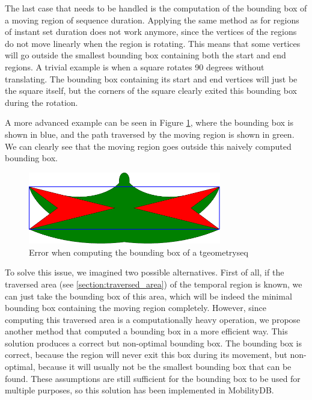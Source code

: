 The last case that needs to be handled is the computation of the bounding box of a moving region of sequence duration. Applying the same method as for regions of instant set duration does not work anymore, since the vertices of the regions do not move linearly when the region is rotating. This means that some vertices will go outside the smallest bounding box containing both the start and end regions. A trivial example is when a square rotates 90 degrees without translating. The bounding box containing its start and end vertices will just be the square itself, but the corners of the square clearly exited this bounding box during the rotation. 

A more advanced example can be seen in Figure \ref{fig:naive_bbox_error}, where the bounding box is shown in blue, and the path traversed by the moving region is shown in green. We can clearly see that the moving region goes outside this naively computed bounding box.

\begin{figure}[h!]
    \centering
    \includegraphics[width=0.75\textwidth]{images/naive_bbox_error.pdf}
    \caption{Error when computing the bounding box of a tgeometryseq}
    \label{fig:naive_bbox_error}
\end{figure}

To solve this issue, we imagined two possible alternatives. First of all, if the traversed area (see \ref{section:traversed_area}) of the temporal region is known, we can just take the bounding box of this area, which will be indeed the minimal bounding box containing the moving region completely. However, since computing this traversed area is a computationally heavy operation, we propose another method that computed a bounding box in a more efficient way. This solution produces a correct but non-optimal bounding box. The bounding box is correct, because the region will never exit this box during its movement, but non-optimal, because it will usually not be the smallest bounding box that can be found. These assumptions are still sufficient for the bounding box to be used for multiple purposes, so this solution has been implemented in MobilityDB.

